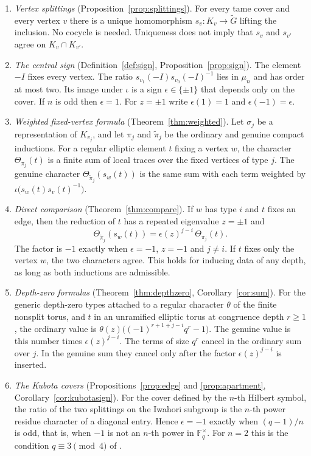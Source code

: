 \documentclass[12pt,letterpaper]{article}
\numberwithin{equation}{section}
\theoremstyle{definition}
\theoremstyle{remark}
\newcommand{\kk}{\mathbb F_q}
\newcommand{\Gt}{\widetilde G}
\newcommand{\sgn}{\epsilon}
\begin{document}
\begin{enumerate}[leftmargin=2em]
\item \emph{Vertex splittings} (Proposition~\ref{prop:splittings}). For every tame cover and every vertex $v$ there is a unique homomorphism $s_v:K_v\to\Gt$ lifting the inclusion. No cocycle is needed. Uniqueness does not imply that $s_v$ and $s_{v'}$ agree on $K_v\cap K_{v'}$.
\item \emph{The central sign} (Definition~\ref{def:sign}, Proposition~\ref{prop:sign}). The element $-I$ fixes every vertex. The ratio $s_{v_1}(-I)s_{v_0}(-I)^{-1}$ lies in $\mu_n$ and has order at most two. Its image under $\iota$ is a sign $\sgn\in\{\pm1\}$ that depends only on the cover. If $n$ is odd then $\sgn=1$. For $z=\pm1$ write $\sgn(1)=1$ and $\sgn(-1)=\sgn$.
\item \emph{Weighted fixed-vertex formula} (Theorem~\ref{thm:weighted}). Let $\sigma_j$ be a representation of $K_{v_j}$, and let $\pi_j$ and $\widetilde\pi_j$ be the ordinary and genuine compact inductions. For a regular elliptic element $t$ fixing a vertex $w$, the character $\Theta_{\pi_j}(t)$ is a finite sum of local traces over the fixed vertices of type $j$. The genuine character $\Theta_{\widetilde\pi_j}(s_w(t))$ is the same sum with each term weighted by $\iota\bigl(s_w(t)s_v(t)^{-1}\bigr)$.
\item \emph{Direct comparison} (Theorem~\ref{thm:compare}). If $w$ has type $i$ and $t$ fixes an edge, then the reduction of $t$ has a repeated eigenvalue $z=\pm1$ and
\begin{equation}\label{eq:intro-main}
 \Theta_{\widetilde\pi_j}(s_w(t))=\sgn(z)^{j-i}\,\Theta_{\pi_j}(t).
\end{equation}
The factor is $-1$ exactly when $\sgn=-1$, $z=-1$ and $j\ne i$. If $t$ fixes only the vertex $w$, the two characters agree. This holds for inducing data of any depth, as long as both inductions are admissible.
\item \emph{Depth-zero formulas} (Theorem~\ref{thm:depthzero}, Corollary~\ref{cor:sum}). For the generic depth-zero types attached to a regular character $\theta$ of the finite nonsplit torus, and $t$ in an unramified elliptic torus at congruence depth $r\ge1$, the ordinary value is $\theta(z)\bigl((-1)^{r+1+j-i}q^r-1\bigr)$. The genuine value is this number times $\sgn(z)^{j-i}$. The terms of size $q^r$ cancel in the ordinary sum over $j$. In the genuine sum they cancel only after the factor $\sgn(z)^{j-i}$ is inserted.
\item \emph{The Kubota covers} (Propositions~\ref{prop:edge} and \ref{prop:apartment}, Corollary~\ref{cor:kubotasign}). For the cover defined by the $n$-th Hilbert symbol, the ratio of the two splittings on the Iwahori subgroup is the $n$-th power residue character of a diagonal entry. Hence $\sgn=-1$ exactly when $(q-1)/n$ is odd, that is, when $-1$ is not an $n$-th power in $\kk^\times$. For $n=2$ this is the condition $q\equiv3\pmod4$ of \cite{Jo26b}.

\end{enumerate}
\end{document}
